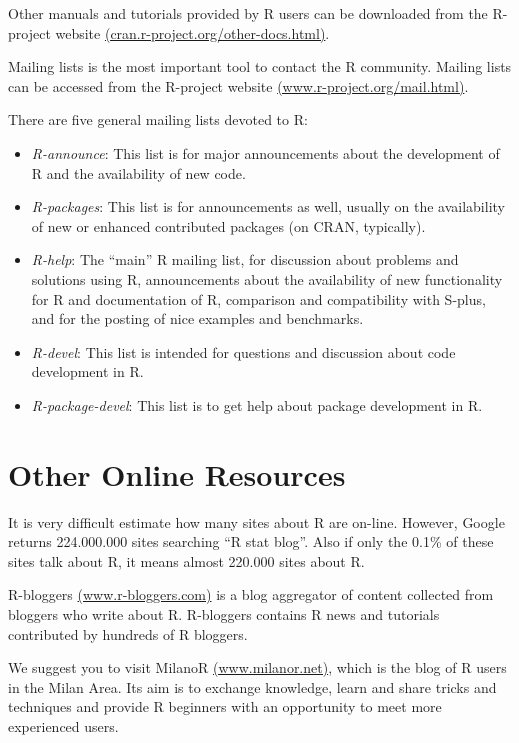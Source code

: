 \documentclass[]{book}
\providecommand{\tightlist}{%
  \setlength{\itemsep}{0pt}\setlength{\parskip}{0pt}}
\def\tightlist{}
\begin{document}
Other manuals and tutorials provided by R users can be downloaded from
the R-project website
\href{http://cran.r-project.org/other-docs.html}{(cran.r-project.org/other-docs.html)}.

Mailing lists is the most important tool to contact the R community.
Mailing lists can be accessed from the R-project website
\href{http://www.r-project.org/mail.html}{(www.r-project.org/mail.html)}.

There are five general mailing lists devoted to R:

\begin{itemize}
\tightlist
\item
  \emph{R-announce}: This list is for major announcements about the
  development of R and the availability of new code.
\item
  \emph{R-packages}: This list is for announcements as well, usually on
  the availability of new or enhanced contributed packages (on CRAN,
  typically).
\item
  \emph{R-help}: The ``main'' R mailing list, for discussion about
  problems and solutions using R, announcements about the availability
  of new functionality for R and documentation of R, comparison and
  compatibility with S-plus, and for the posting of nice examples and
  benchmarks.
\item
  \emph{R-devel}: This list is intended for questions and discussion
  about code development in R.
\item
  \emph{R-package-devel}: This list is to get help about package
  development in R.
\end{itemize}

\section{Other Online Resources}\label{other-online-resources}

It is very difficult estimate how many sites about R are on-line.
However, Google returns 224.000.000 sites searching ``R stat blog''.
Also if only the 0.1\% of these sites talk about R, it means almost
220.000 sites about R.

R-bloggers \href{http://www.r-bloggers.com/}{(www.r-bloggers.com)} is a
blog aggregator of content collected from bloggers who write about R.
R-bloggers contains R news and tutorials contributed by hundreds of R
bloggers.

We suggest you to visit MilanoR
\href{http://www.milanor.net/}{(www.milanor.net)}, which is the blog of
R users in the Milan Area. Its aim is to exchange knowledge, learn and
share tricks and techniques and provide R beginners with an opportunity
to meet more experienced users.
\end{document}
